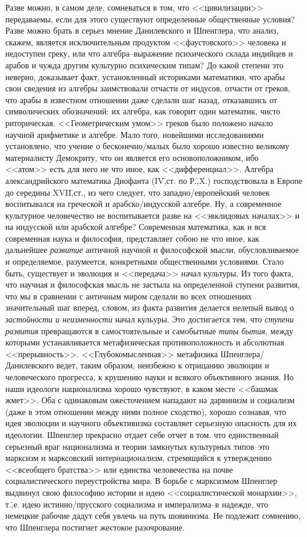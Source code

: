 Разве можно, в самом деле, сомневаться в том, что <<цивилизации>> передаваемы, если для этого существуют определенные общественные условия? Разве можно брать в серьез мнение Данилевского и Шпенглера, что анализ, скажем, является исключительным продуктом <<фаустовского>> человека и недоступен греку, или что алгебра\---выражение психического склада индийцев и арабов и чужда другим культурно психическим типам? До какой степени это неверно, доказывает факт, установленный историками математики, что арабы свои сведения из алгебры заимствовали отчасти от индусов, отчасти от греков, что арабы в известном отношении даже сделали шаг назад, отказавшись от символических обозначений: их алгебра, как говорит один математик, чисто риторическая. <<Геометрическим умом>> греков было положено начало научной арифметике и алгебре. Мало того, новейшими исследованиями установлено, что учение о бесконечно\-/малых было хорошо известно великому материалисту Демокриту, что он является его основоположником, ибо <<атом>> есть для него не что иное, как <<дифференциал>>. Алгебра александрийского математика Диофанта (IV\=,ст. по Р.\=,X.) господствовала в Европе до середины XVII\=,ст., из чего следует, что западно\-/европейский человек воспитывался на греческой и арабско\-/индусской алгебре. Ну, а современное культурное человечество не воспитывается разве на <<эвклидовых началах>> и на индусской или арабской алгебре? Современная математика, как и вся современная наука и философия, представляет собою не что иное, как дальнейшее \emph{развитие} античной научной и философской мысли, обусловливаемое и определяемое, разумеется, конкретными общественными условиями. Стало быть, существует и эволюция и <<передача>> начал культуры. Из того факта, что научная и философская мысль не застыла на определенной ступени развития, что мы в сравнении с античным миром сделали во всех отношениях значительный шаг вперед, словом, из факта развития делается нелепый вывод о \emph{застойности и неизменности} начал кульуры. Это достигается тем, что \emph{ступени развития} превращаются в самостоятельные и самобытные \emph{типы бытия,} между которыми устанавливается метафизическая противоположность и абсолютная <<прерывность>>. <<Глубокомысленная>> метафизика Шпенглера\-/Данилевского ведет, таким образом, неизбежно к отрицанию эволюции и человеческого прогресса, к крушению науки и всякого объективного знания. Но наши идеологи национализма хорошо чувствуют, в каком месте <<башмак жмет>>. Оба с одинаковым ожесточением нападают на дарвинизм и социализм (даже в этом отношении между ними полное сходство), хорошо сознавая, что идея эволюции и научного объективизма составляет серьезную опасность для их идеологии. Шпенглер прекрасно отдает себе отчет в том. что единственный серьезный враг национализма и теории замкнутых культурных типов\---это марксизм и марксовский интернационализм, стремящийся к утверждению <<всеобщего братства>> или единства человечества на почве социалистического переустройства мира. В борьбе с марксизмом Шпенглер выдвинул свою философию истории и идею <<социалистической монархии>>, т.\=,е. идею истинно\-/прусского социализма и имперализма\---в надежде, что немецкие рабочие дадут себя увлечь на путь шовинизма. Не подлежит сомнению, что Шпенглера постигнет жестокое разочрование.

